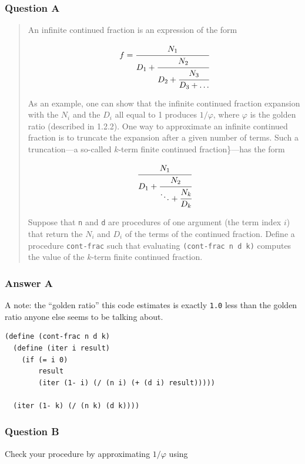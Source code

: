 \documentclass[final,fleqn,titlepage,twoside]{article}
\begin{document}
\subsubsection{Question A}
\label{sec:org11676c6}
\begin{quote}
An infinite continued fraction is an expression of the form

\[ {f} = \cfrac{N_1}{D_1 + \cfrac{N_2}{D_2 + \cfrac{N_3}{D_3 + \dots}}} \]

As an example, one can show that the infinite continued fraction expansion with
the \(N_i\) and the \(D_i\) all equal to 1 produces \(1 / \varphi\), where
\(\varphi\) is the golden ratio (described in 1.2.2). One way to approximate an
infinite continued fraction is to truncate the expansion after a given number of
terms. Such a truncation---a so-called \(k\)-term finite continued
fraction\}---has the form

\[ \cfrac{N_1}{D_1 + \cfrac{N_2}{\ddots + \cfrac{N_k}{D_k}}} \]

Suppose that \texttt{n} and \texttt{d} are procedures of one argument (the
term index \(i\)) that return the \(N_i\) and \(D_i\) of the terms of the
continued fraction. Define a procedure \texttt{cont-frac} such that
evaluating \texttt{(cont-frac n d k)} computes the value of the \(k\)-term
finite continued fraction.
\end{quote}

\subsubsection{Answer A}
\label{sec:org97917a4}
A note: the ``golden ratio'' this code estimates is exactly \texttt{1.0} less than the
golden ratio anyone else seems to be talking about.
\begin{verbatim}
(define (cont-frac n d k)
  (define (iter i result)
    (if (= i 0)
        result
        (iter (1- i) (/ (n i) (+ (d i) result)))))

  (iter (1- k) (/ (n k) (d k))))
\end{verbatim}

\subsubsection{Question B}
\label{sec:org254dc07}
Check your procedure by approximating \(1 / \varphi\) using
\end{document}
